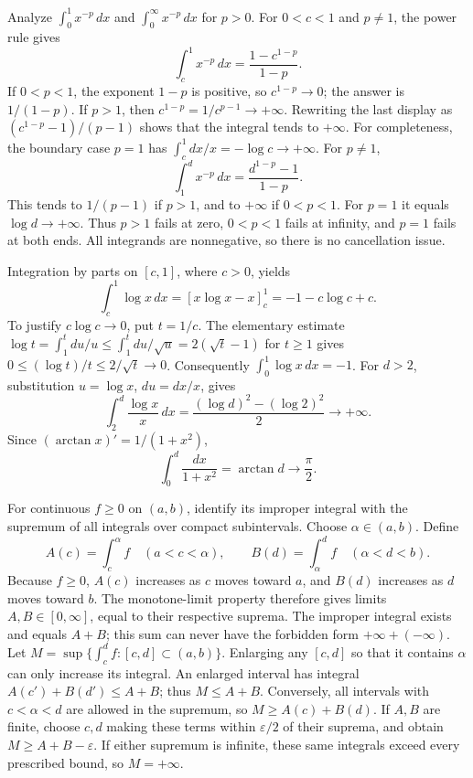 \goal Analyze $\int_0^1 x^{-p}\,dx$ and $\int_0^\infty x^{-p}\,dx$
for $p>0$.
For $0<c<1$ and $p\ne1$, the power rule gives
\[
 \int_c^1 x^{-p}\,dx=\frac{1-c^{1-p}}{1-p}.
\]
If $0<p<1$, the exponent $1-p$ is positive, so $c^{1-p}\to0$;
the answer is $1/(1-p)$. If $p>1$, then
$c^{1-p}=1/c^{p-1}\to+\infty$. Rewriting the last display as
$(c^{1-p}-1)/(p-1)$ shows that the integral tends to $+\infty$.
For completeness, the boundary case $p=1$ has
$\int_c^1 dx/x=-\log c\to+\infty$.
For $p\ne1$,
\[
 \int_1^d x^{-p}\,dx=\frac{d^{1-p}-1}{1-p}.
\]
This tends to $1/(p-1)$ if $p>1$, and to $+\infty$ if $0<p<1$.
For $p=1$ it equals $\log d\to+\infty$. Thus $p>1$ fails at
zero, $0<p<1$ fails at infinity, and $p=1$ fails at both ends.
All integrands are nonnegative, so there is no cancellation issue.

Integration by parts on $[c,1]$, where $c>0$, yields
\[
 \int_c^1\log x\,dx=[x\log x-x]_c^1=-1-c\log c+c.
\]
To justify $c\log c\to0$, put $t=1/c$. The elementary estimate
$\log t=\int_1^t du/u\leq\int_1^t du/\sqrt u
=2(\sqrt t-1)$ for $t\geq1$ gives
$0\leq(\log t)/t\leq2/\sqrt t\to0$.
Consequently $\int_0^1\log x\,dx=-1$.
For $d>2$, substitution $u=\log x$, $du=dx/x$, gives
\[
 \int_2^d\frac{\log x}{x}\,dx
 =\frac{(\log d)^2-(\log2)^2}{2}\longrightarrow+\infty.
\]
Since $(\arctan x)'=1/(1+x^2)$,
\[
 \int_0^d\frac{dx}{1+x^2}=\arctan d\longrightarrow\frac\pi2.
\]

\goal For continuous $f\geq0$ on $(a,b)$, identify its improper
integral with the supremum of all integrals over compact subintervals.
Choose $\alpha\in(a,b)$. Define
\[
 A(c)=\int_c^\alpha f\quad(a<c<\alpha),\qquad
 B(d)=\int_\alpha^d f\quad(\alpha<d<b).
\]
Because $f\geq0$, $A(c)$ increases as $c$ moves toward $a$,
and $B(d)$ increases as $d$ moves toward $b$. The monotone-limit
property therefore gives limits $A,B\in[0,\infty]$, equal to their
respective suprema. The improper integral exists and equals $A+B$;
this sum can never have the forbidden form $+\infty+(-\infty)$.
Let $M=\sup\{\int_c^d f:[c,d]\subset(a,b)\}$. Enlarging any
$[c,d]$ so that it contains $\alpha$ can only increase its integral.
An enlarged interval has integral $A(c')+B(d')\leq A+B$; thus
$M\leq A+B$. Conversely, all intervals with $c<\alpha<d$ are
allowed in the supremum, so $M\geq A(c)+B(d)$. If $A,B$ are
finite, choose $c,d$ making these terms within $\varepsilon/2$ of
their suprema, and obtain $M\geq A+B-\varepsilon$. If either
supremum is infinite, these same integrals exceed every prescribed
bound, so $M=+\infty$.

